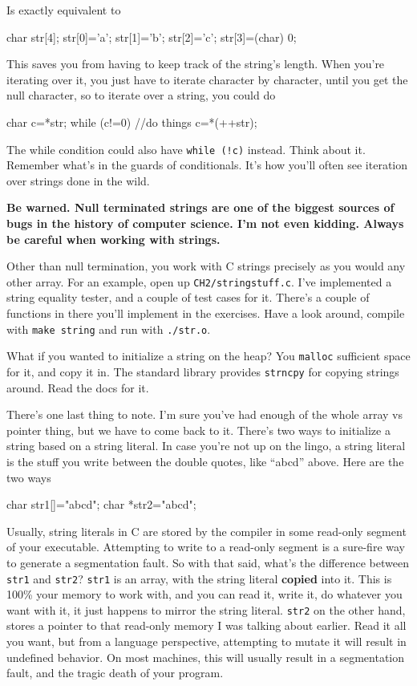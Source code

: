 \documentclass[ebook,11pt,oneside,openany]{memoir}
\newcommand{\cf}[1]{\texttt{#1}}
\begin{document}
\noindent
Is exactly equivalent to 

\begin{code}[language=C]
char str[4];
str[0]='a';
str[1]='b';
str[2]='c';
str[3]=(char) 0;
\end{code}

This saves you from having to keep track of the string's length. When you're iterating over it, you just have to iterate character by character, until you get the null character, so to iterate over a string, you could do
\begin{code}[language=C]
char c=*str;
while (c!=0)
{
  //do things
  c=*(++str);
}
\end{code}

The while condition could also have \cf{while (!c)} instead. Think about it. Remember what's in the guards of conditionals. It's how you'll often see iteration over strings done in the wild.

\textbf{Be warned. Null terminated strings are one of the biggest sources of bugs in the history of computer science. I'm not even kidding. Always be careful when working with strings.}

Other than null termination, you work with C strings precisely as you would any other array. For an example, open up \texttt{CH2/stringstuff.c}. I've implemented a string equality tester, and a couple of test cases for it. There's a couple of functions in there you'll implement in the exercises. Have a look around, compile with \texttt{make string} and run with \texttt{./str.o}.

What if you wanted to initialize a string on the heap? You \cf{malloc} sufficient space for it, and copy it in. The standard library provides \cf{strncpy} for copying strings around. Read the docs for it.

There's one last thing to note. I'm sure you've had enough of the whole array vs pointer thing, but we have to come back to it. There's two ways to initialize a string based on a string literal. In case you're not up on the lingo, a string literal is the stuff you write between the double quotes, like ``abcd'' above. Here are the two ways

\begin{code}[language=C]
char str1[]="abcd";
char *str2="abcd";
\end{code}

Usually, string literals in C are stored by the compiler in some read-only segment of your executable. Attempting to write to a read-only segment is a sure-fire way to generate a segmentation fault. So with that said, what's the difference between \cf{str1} and \cf{str2}? \cf{str1} is an array, with the string literal \textbf{copied} into it. This is 100\% your memory to work with, and you can read it, write it, do whatever you want with it, it just happens to mirror the string literal. \cf{str2} on the other hand, stores a pointer to that read-only memory I was talking about earlier. Read it all you want, but from a language perspective, attempting to mutate it will result in undefined behavior. On most machines, this will usually result in a segmentation fault, and the tragic death of your program.
\end{document}

